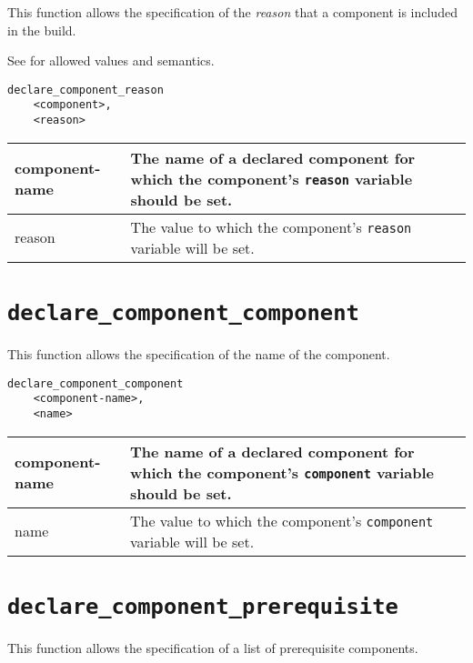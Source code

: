This function allows the specification of the \emph{reason} that a
component is included in the build.

See  for allowed values and semantics.

\begin{minipage}{\linewidth}
\begin{verbatim}
declare_component_reason
    <component>,
    <reason>
\end{verbatim}

\begin{tabularx}{\linewidth}{l|X}
component-name &
  The name of a declared component for which the component's
  \texttt{reason} variable should be set. \\

\hline reason &
  The value to which the component's \texttt{reason} variable will be
  set.
\end{tabularx}
\end{minipage}

\section{\texttt{declare\_component\_component}}\label{api:component}

This function allows the specification of the name of the component.

\begin{minipage}{\linewidth}
\begin{verbatim}
declare_component_component
    <component-name>,
    <name>
\end{verbatim}

\begin{tabularx}{\linewidth}{l|X}
component-name &

  The name of a declared component for which the component's
  \texttt{component} variable should be set. \\

\hline name &
  The value to which the component's \texttt{component} variable will
  be set.
\end{tabularx}
\end{minipage}

\section{\texttt{declare\_component\_prerequisite}}\label{api:prerequisite}

This function allows the specification of a list of prerequisite
components.

